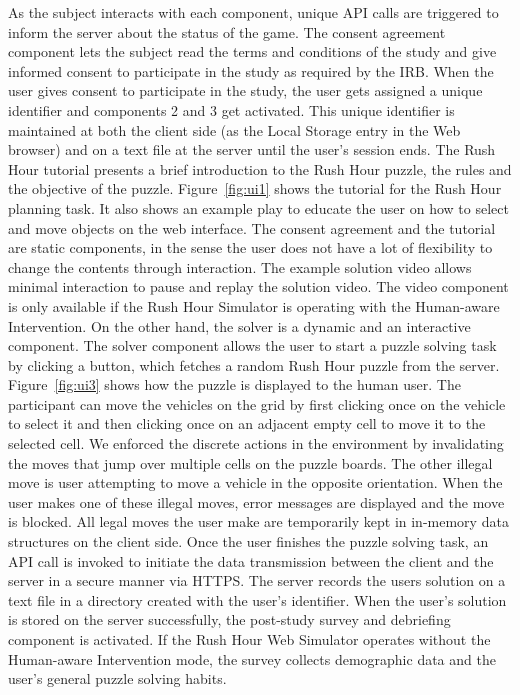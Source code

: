 As the subject interacts with each component, unique API calls are triggered to inform the server about the status of the game. 
The consent agreement component lets the subject read the terms and conditions of the study and give informed consent to participate in the study as required by the IRB. 
When the user gives consent to participate in the study, the user gets assigned a unique identifier and components 2 and 3 get activated. 
This unique identifier is maintained at both the client side (as the Local Storage entry in the Web browser) and on a text file at the server until the user's session ends. 
The Rush Hour tutorial presents a brief introduction to the Rush Hour puzzle, the rules and the objective of the puzzle. 
Figure~\ref{fig:ui1} shows the tutorial for the Rush Hour planning task.
It also shows an example play to educate the user on how to select and move objects on the web interface. 
The consent agreement and the tutorial are static components, in the sense the user does not have a lot of flexibility to change the contents through interaction. 
The example solution video allows minimal interaction to pause and replay the solution video.
The video component is only available if the Rush Hour Simulator is operating with the Human-aware Intervention.
On the other hand, the solver is a dynamic and an interactive component. 
The solver component allows the user to start a puzzle solving task by clicking a button, which fetches a random Rush Hour puzzle from the server. 
Figure~\ref{fig:ui3} shows how the puzzle is displayed to the human user.
The participant can move the vehicles on the grid by first clicking once on the vehicle to select it and then clicking once on an adjacent empty cell to move it to the selected cell. 
We enforced the discrete actions in the environment by invalidating the moves that jump over multiple cells on the puzzle boards. 
The other illegal move is user attempting to move a vehicle in the opposite orientation. When the user makes one of these illegal moves, error messages are displayed and the move is blocked. 
All legal moves the user make are temporarily kept in in-memory data structures on the client side. 
Once the user finishes the puzzle solving task, an API call is invoked to initiate the data transmission between the client and the server in a secure manner via HTTPS. 
The server records the users solution on a text file in a directory created with the user's identifier. 
When the user's solution is stored on the server successfully, the post-study survey and debriefing component is activated. 
If the Rush Hour Web Simulator operates without the Human-aware Intervention mode, the survey collects demographic data and the user's general puzzle solving habits.
